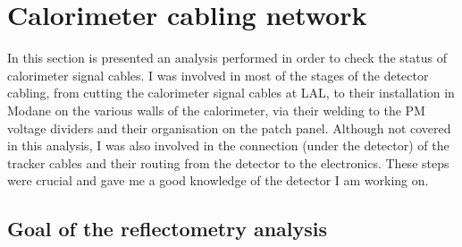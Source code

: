 \section{Calorimeter cabling network}
\label{sec:reflecto}

In this section is presented an analysis performed in order to check the status of calorimeter signal cables.
I was involved in most of the stages of the detector cabling, from cutting the calorimeter signal cables at LAL, to their installation in Modane on the various walls of the calorimeter, via their welding to the PM voltage dividers and their organisation on the patch panel.
Although not covered in this analysis, I was also involved in the connection (under the detector) of the tracker cables and their routing from the detector to the electronics.
These steps were crucial and gave me a good knowledge of the detector I am working on.

\subsection{Goal of the reflectometry analysis}

